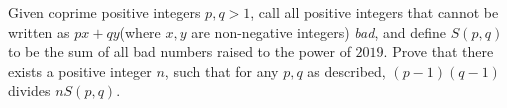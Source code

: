 Given coprime positive integers $p,q>1$, call all positive integers that cannot be written as $px+qy$(where $x,y$ are non-negative integers) \textit{bad}, and define $S(p,q)$ to be the sum of all bad numbers raised to the power of $2019$. Prove that there exists a positive integer $n$, such that for any $p,q$ as described, $(p-1)(q-1)$ divides $nS(p,q)$.